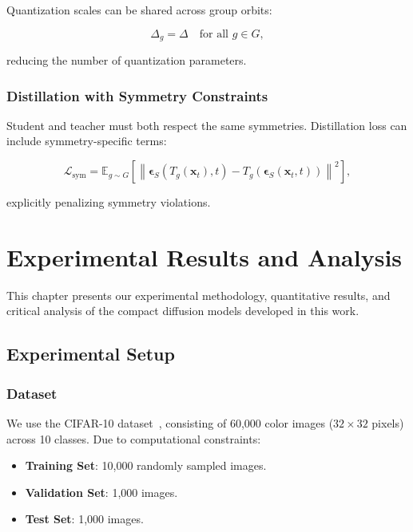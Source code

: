 \documentclass[12pt]{report}
\theoremstyle{definition}
\newcommand{\E}{\mathbb{E}}
\newcommand{\loss}{\mathcal{L}}
\newcommand{\norm}[1]{\left\| #1 \right\|}
\begin{document}
Quantization scales can be shared across group orbits:

\begin{equation}
\Delta_g = \Delta \quad \text{for all } g \in G,
\label{eq:shared_quantization_scale}
\end{equation}

reducing the number of quantization parameters.

\subsection{Distillation with Symmetry Constraints}

Student and teacher must both respect the same symmetries. Distillation loss can include symmetry-specific terms:

\begin{equation}
\loss_{\text{sym}} = \E_{g \sim G}\left[\norm{\boldsymbol{\epsilon}_S(T_g(\mathbf{x}_t), t) - T_g(\boldsymbol{\epsilon}_S(\mathbf{x}_t, t))}^2\right],
\label{eq:symmetry_distillation_loss}
\end{equation}

explicitly penalizing symmetry violations.

\chapter{Experimental Results and Analysis}

This chapter presents our experimental methodology, quantitative results, and critical analysis of the compact diffusion models developed in this work.

\section{Experimental Setup}

\subsection{Dataset}

We use the CIFAR-10 dataset~\citep{krizhevsky2009learning}, consisting of 60,000 color images ($32 \times 32$ pixels) across 10 classes. Due to computational constraints:

\begin{itemize}
\item \textbf{Training Set}: 10,000 randomly sampled images.
\item \textbf{Validation Set}: 1,000 images.
\item \textbf{Test Set}: 1,000 images.
\end{itemize}
\end{document}
